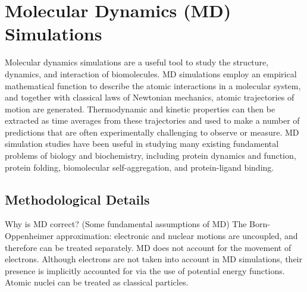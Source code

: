\section{Molecular Dynamics (MD) Simulations} %
\1 Molecular dynamics simulations are a useful tool to study the structure, dynamics, and interaction of biomolecules. MD simulations employ an empirical mathematical function to describe the atomic interactions in a molecular system, and together with classical laws of Newtonian mechanics, atomic trajectories of motion are generated. Thermodynamic and kinetic properties can then be extracted as time averages from these trajectories and used to make a number of predictions that are often experimentally challenging to observe or measure. 
\1 MD simulation studies have been useful in studying many existing fundamental problems of biology and biochemistry, including protein dynamics and function, protein folding, biomolecular self-aggregation, and protein-ligand binding.

\subsection{Methodological Details} %




\1 Why is MD correct? (Some fundamental assumptions of MD)
  \2 The Born-Oppenheimer approximation: electronic and nuclear motions are uncoupled, and therefore can be treated separately. MD does not account for the movement of electrons. Although electrons are not taken into account in MD simulations, their presence is implicitly accounted for via the use of potential energy functions.  Atomic nuclei can be treated as classical particles.

